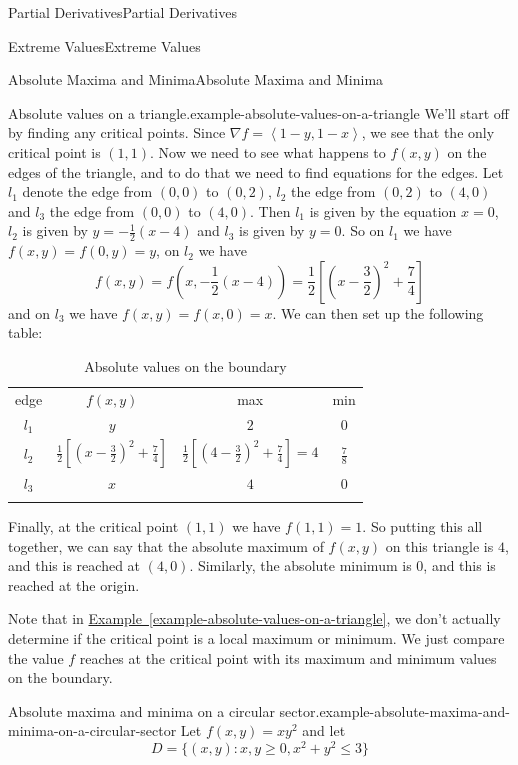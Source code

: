 \documentclass[10pt,]{book}
\numberwithin{equation}{section}
\newcommand{\hrulethin}  {\noalign{\hrule height 0.04em}}
\newcommand{\hrulethick} {\noalign{\hrule height 0.11em}}
\newcommand{\grad}{\nabla}
\newcommand{\dotprod}[1]{\left\langle #1 \right\rangle}
\begin{document}
\begin{chapterptx}{Partial Derivatives}{}{Partial Derivatives}{}{}
\begin{sectionptx}{Extreme Values}{}{Extreme Values}{}{}
\begin{subsectionptx}{Absolute Maxima and Minima}{}{Absolute Maxima and Minima}{}{}
\begin{example}{Absolute values on a triangle.}{example-absolute-values-on-a-triangle}
We'll start off by finding any critical points. Since \(\grad f = \dotprod{1-y, 1-x}\), we see that the only critical point is \((1,1)\). Now we need to see what happens to \(f(x,y)\) on the edges of the triangle, and to do that we need to find equations for the edges. Let \(l_{1}\) denote the edge from \((0,0)\) to \((0,2)\), \(l_{2}\) the edge from \((0,2)\) to \((4,0)\) and \(l_{3}\) the edge from \((0,0)\) to \((4,0)\). Then \(l_{1}\) is given by the equation \(x = 0\), \(l_{2}\) is given by \(y = -\frac{1}{2}(x-4)\) and \(l_{3}\) is given by \(y = 0\). So on \(l_{1}\) we have \(f(x,y) = f(0,y) = y\), on \(l_{2}\) we have%
\begin{equation*}
f(x,y) = f\left(x,-\frac{1}{2}(x-4)\right) = \frac{1}{2}\left[\left(x-\frac{3}{2}\right)^{2} + \frac{7}{4}\right]
\end{equation*}
and on \(l_{3}\) we have \(f(x,y) = f(x,0) = x\). We can then set up the following table:%
\begin{table}
\centering
\begin{tabular}{cccc}\hrulethick
edge&\(f(x,y)\)&max&min\tabularnewline\hrulethin
\(l_{1}\)&\(y\)&\(2\)&\(0\)\tabularnewline[0pt]
\(l_{2}\)&\(\frac{1}{2}\left[\left(x-\frac{3}{2}\right)^{2} + \frac{7}{4}\right]\)&\(\frac{1}{2}\left[\left(4-\frac{3}{2}\right)^{2} + \frac{7}{4}\right] = 4\)&\(\frac{7}{8}\)\tabularnewline[0pt]
\(l_{3}\)&\(x\)&\(4\)&\(0\)\tabularnewline\hrulethick
\end{tabular}
\caption{Absolute values on the boundary\label{table-triangle-extrema}}
\end{table}
\hypertarget{p-1217}{}%
Finally, at the critical point \((1,1)\) we have \(f(1,1) = 1\). So putting this all together, we can say that the absolute maximum of \(f(x,y)\) on this triangle is \(4\), and this is reached at \((4,0)\). Similarly, the absolute minimum is \(0\), and this is reached at the origin.%
\end{example}
\hypertarget{p-1218}{}%
Note that in \hyperref[example-absolute-values-on-a-triangle]{Example~\ref{example-absolute-values-on-a-triangle}}, we don't actually determine if the critical point is a local maximum or minimum. We just compare the value \(f\) reaches at the critical point with its maximum and minimum values on the boundary.%
\begin{example}{Absolute maxima and minima on a circular sector.}{example-absolute-maxima-and-minima-on-a-circular-sector}%
\hypertarget{p-1219}{}%
Let \(f(x,y) = xy^{2}\) and let%
\begin{equation*}
D = \{(x,y) : x,y \geq 0, x^{2} + y^{2} \leq 3\}

\end{equation*}
\end{example}
\end{subsectionptx}
\end{sectionptx}
\end{chapterptx}
\end{document}
